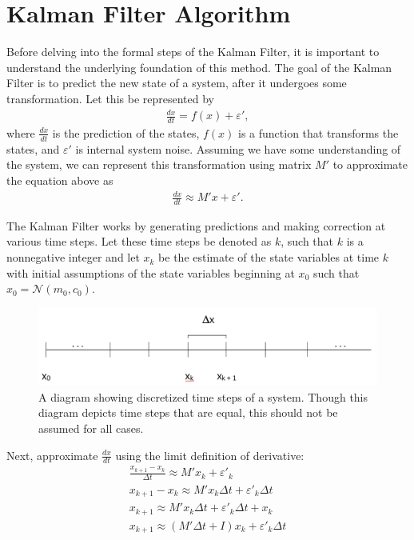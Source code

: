 \newpage

\section{Kalman Filter Algorithm}

Before  delving into the formal steps of the Kalman Filter, it is important to understand the underlying foundation of this method. 
\noindent The goal of the Kalman Filter is to predict the new state of a system, after it undergoes some transformation. Let this be represented by 
\begin{align*}
	\frac{dx}{dt} = f(x) + \varepsilon ',
\end{align*}
where $\frac{dx}{dt}$ is the prediction of the states, $f(x)$ is a function that transforms the states, and $ \varepsilon '$ is internal system noise. Assuming we have some understanding of the system, we can represent this transformation using matrix $M'$ to approximate the equation above as
\begin{align*}
	\frac{dx}{dt} \approx M'x + \varepsilon '.
\end{align*}

\noindent The Kalman Filter works by generating predictions and making correction at various time steps. Let these time steps be denoted as $k$, such that $ k $ is a nonnegative integer and let $x_k$ be the estimate of the state variables at time $k$ with initial assumptions of the state variables beginning at $x_0$ such that $x_0 = \mathcal{N}(m_0, c_0) $. 

\begin{figure}[h]
    \centering
    \includegraphics[scale = 0.3]{kgraph.png}
    \caption{A diagram showing discretized time steps of a system. Though this diagram depicts time steps that are equal, this should not be assumed for all cases.}
\end{figure}

\noindent Next, approximate $\frac{dx}{dt}$ using the limit definition of derivative:
\begin{align*}
	\frac{x_{k+1} - x_k}{\Delta t} \approx M'x_k + \varepsilon '_k \\
	x_{k+1} - x_k \approx M'x_k \Delta t + \varepsilon '_k  \Delta t \\
	x_{k+1} \approx M'x_k \Delta t + \varepsilon '_k  \Delta t + x_k \\
	x_{k+1} \approx (M' \Delta t + I)x_k + \varepsilon '_k  \Delta t
\end{align*}


